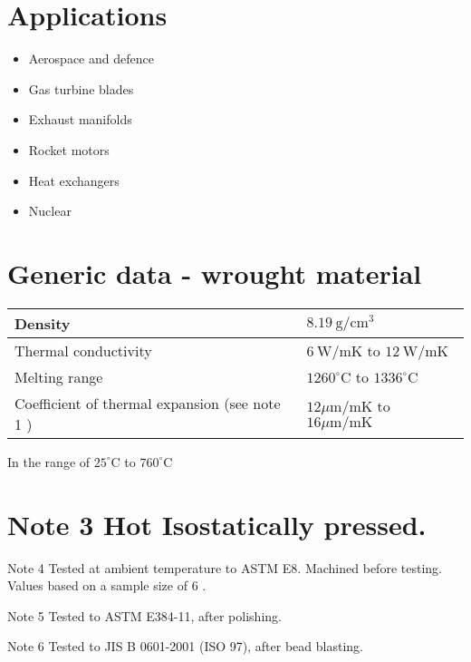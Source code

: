 \documentclass[10pt]{article}
\begin{document}
\section*{Applications}
\begin{itemize}
  \item Aerospace and defence

  \item Gas turbine blades

  \item Exhaust manifolds

  \item Rocket motors

  \item Heat exchangers

  \item Nuclear

\end{itemize}

\section*{Generic data - wrought material}
\begin{center}
\begin{tabular}{|l|l|}
\hline
Density & $8.19 \mathrm{~g} / \mathrm{cm}^{3}$ \\
\hline
Thermal conductivity & $6 \mathrm{~W} / \mathrm{mK}$ to $12 \mathrm{~W} / \mathrm{mK}$ \\
\hline
Melting range & $1260^{\circ} \mathrm{C}$ to $1336^{\circ} \mathrm{C}$ \\
\hline
Coefficient of thermal expansion (see note 1 ) & $12 \mu \mathrm{m} / \mathrm{mK}$ to $16 \mu \mathrm{m} / \mathrm{mK}$ \\
\hline
\end{tabular}
\end{center}

In the range of $25^{\circ} \mathrm{C}$ to $760^{\circ} \mathrm{C}$

\section*{Note 3 Hot Isostatically pressed.}
Note 4 Tested at ambient temperature to ASTM E8. Machined before testing. Values based on a sample size of 6 .

Note 5 Tested to ASTM E384-11, after polishing.

Note 6 Tested to JIS B 0601-2001 (ISO 97), after bead blasting.
\end{document}
